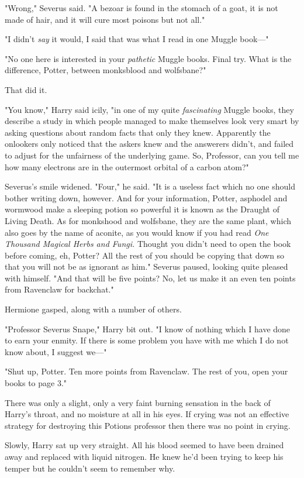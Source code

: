 "Wrong," Severus said. "A bezoar is found in the stomach of a goat, it is not
made of hair, and it will cure most poisons but not all."

"I didn't \emph{say} it would, I said that was what I read in one Muggle
book\mbox{---}"

"No one here is interested in your \emph{pathetic} Muggle books. Final try.
What is the difference, Potter, between monksblood and wolfsbane?"

That did it.

"You know," Harry said icily, "in one of my quite \emph{fascinating} Muggle
books, they describe a study in which people managed to make themselves look
very smart by asking questions about random facts that only they knew.
Apparently the onlookers only noticed that the askers knew and the answerers
didn't, and failed to adjust for the unfairness of the underlying game. So,
Professor, can you tell me how many electrons are in the outermost orbital of a
carbon atom?"

Severus's smile widened. "Four," he said. "It is a useless fact which no one
should bother writing down, however. And for your information, Potter, asphodel
and wormwood make a sleeping potion so powerful it is known as the Draught of
Living Death. As for monkshood and wolfsbane, they are the same plant, which
also goes by the name of aconite, as you would know if you had read \emph{One
Thousand Magical Herbs and Fungi.} Thought you didn't need to open the book
before coming, eh, Potter? All the rest of you should be copying that down so
that you will not be as ignorant as him." Severus paused, looking quite pleased
with himself. "And that will be{\el} five points? No, let us make it an even
ten points from Ravenclaw for backchat."

Hermione gasped, along with a number of others.

"Professor Severus Snape," Harry bit out. "I know of nothing which I have done
to earn your enmity. If there is some problem you have with me which I do not
know about, I suggest we\mbox{---}"

"Shut up, Potter. Ten more points from Ravenclaw. The rest of you, open your
books to page 3."

There was only a slight, only a very faint burning sensation in the back of
Harry's throat, and no moisture at all in his eyes. If crying was not an
effective strategy for destroying this Potions professor then there was no
point in crying.

Slowly, Harry sat up very straight. All his blood seemed to have been drained
away and replaced with liquid nitrogen. He knew he'd been trying to keep his
temper but he couldn't seem to remember why.

